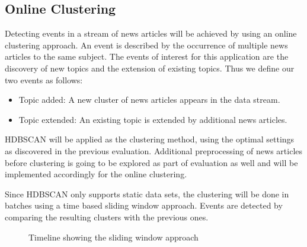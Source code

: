 \subsection{Online Clustering}

Detecting events in a stream of news articles will be achieved by using an online clustering approach. An event is described by the occurrence of multiple news articles to the same subject.  The events of interest for this application are the discovery of new topics and the extension of existing topics. Thus we define our two events as follows:

\begin{itemize}
    \item Topic added: A new cluster of news articles appears in the data stream.
    \item Topic extended: An existing topic is extended by additional news articles.
\end{itemize}

HDBSCAN will be applied as the clustering method, using the optimal settings as discovered in the previous evaluation. Additional preprocessing of news articles before clustering is going to be explored as part of evaluation as well and will be implemented accordingly for the online clustering.

Since HDBSCAN only supports static data sets, the clustering will be done in batches using a time based sliding window approach. Events are detected by comparing the resulting clusters with the previous ones.

\begin{figure}[h]
    \centering


    \caption{Timeline showing the sliding window approach}
    \label{fig:timeline}
\end{figure}

